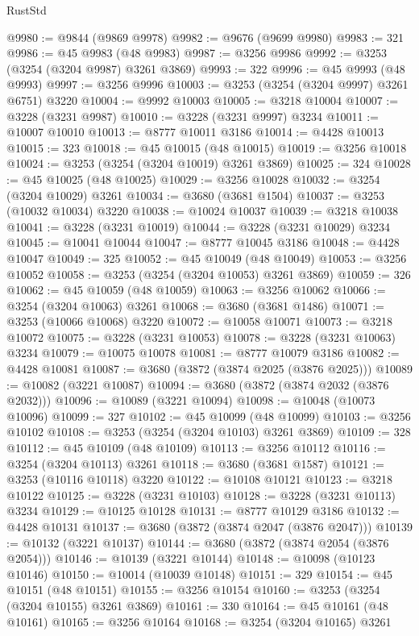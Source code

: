 \begin{lexlean}{RustStd}
\begin{coremodule}
@9980 := @9844 (@9869 @9978)
@9982 := @9676 (@9699 @9980)
@9983 := 321
@9986 := @45 @9983 (@48 @9983)
@9987 := @3256 @9986
@9992 := @3253 (@3254 (@3204 @9987) @3261 @3869)
@9993 := 322
@9996 := @45 @9993 (@48 @9993)
@9997 := @3256 @9996
@10003 := @3253 (@3254 (@3204 @9997) @3261 @6751) @3220
@10004 := @9992 @10003
@10005 := @3218 @10004
@10007 := @3228 (@3231 @9987)
@10010 := @3228 (@3231 @9997) @3234
@10011 := @10007 @10010
@10013 := @8777 @10011 @3186
@10014 := @4428 @10013
@10015 := 323
@10018 := @45 @10015 (@48 @10015)
@10019 := @3256 @10018
@10024 := @3253 (@3254 (@3204 @10019) @3261 @3869)
@10025 := 324
@10028 := @45 @10025 (@48 @10025)
@10029 := @3256 @10028
@10032 := @3254 (@3204 @10029) @3261
@10034 := @3680 (@3681 @1504)
@10037 := @3253 (@10032 @10034) @3220
@10038 := @10024 @10037
@10039 := @3218 @10038
@10041 := @3228 (@3231 @10019)
@10044 := @3228 (@3231 @10029) @3234
@10045 := @10041 @10044
@10047 := @8777 @10045 @3186
@10048 := @4428 @10047
@10049 := 325
@10052 := @45 @10049 (@48 @10049)
@10053 := @3256 @10052
@10058 := @3253 (@3254 (@3204 @10053) @3261 @3869)
@10059 := 326
@10062 := @45 @10059 (@48 @10059)
@10063 := @3256 @10062
@10066 := @3254 (@3204 @10063) @3261
@10068 := @3680 (@3681 @1486)
@10071 := @3253 (@10066 @10068) @3220
@10072 := @10058 @10071
@10073 := @3218 @10072
@10075 := @3228 (@3231 @10053)
@10078 := @3228 (@3231 @10063) @3234
@10079 := @10075 @10078
@10081 := @8777 @10079 @3186
@10082 := @4428 @10081
@10087 := @3680 (@3872 (@3874 @2025 (@3876 @2025)))
@10089 := @10082 (@3221 @10087)
@10094 := @3680 (@3872 (@3874 @2032 (@3876 @2032)))
@10096 := @10089 (@3221 @10094)
@10098 := @10048 (@10073 @10096)
@10099 := 327
@10102 := @45 @10099 (@48 @10099)
@10103 := @3256 @10102
@10108 := @3253 (@3254 (@3204 @10103) @3261 @3869)
@10109 := 328
@10112 := @45 @10109 (@48 @10109)
@10113 := @3256 @10112
@10116 := @3254 (@3204 @10113) @3261
@10118 := @3680 (@3681 @1587)
@10121 := @3253 (@10116 @10118) @3220
@10122 := @10108 @10121
@10123 := @3218 @10122
@10125 := @3228 (@3231 @10103)
@10128 := @3228 (@3231 @10113) @3234
@10129 := @10125 @10128
@10131 := @8777 @10129 @3186
@10132 := @4428 @10131
@10137 := @3680 (@3872 (@3874 @2047 (@3876 @2047)))
@10139 := @10132 (@3221 @10137)
@10144 := @3680 (@3872 (@3874 @2054 (@3876 @2054)))
@10146 := @10139 (@3221 @10144)
@10148 := @10098 (@10123 @10146)
@10150 := @10014 (@10039 @10148)
@10151 := 329
@10154 := @45 @10151 (@48 @10151)
@10155 := @3256 @10154
@10160 := @3253 (@3254 (@3204 @10155) @3261 @3869)
@10161 := 330
@10164 := @45 @10161 (@48 @10161)
@10165 := @3256 @10164
@10168 := @3254 (@3204 @10165) @3261

\end{coremodule}
\end{lexlean}
